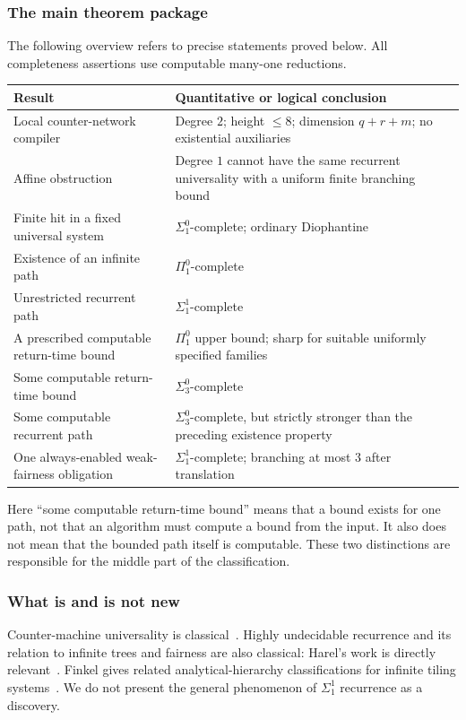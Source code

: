 \documentclass[11pt,letterpaper]{article}
\theoremstyle{definition}
\theoremstyle{remark}
\newcommand{\1}{\mathbf 1}
\begin{document}
\subsubsection{The main theorem package}

The following overview refers to precise statements proved below. All
completeness assertions use computable many-one reductions.

\begin{center}
\small
\begin{tabular}{@{}p{}p{}@{}}
\toprule
Result & Quantitative or logical conclusion\\
\midrule
Local counter-network compiler & Degree $2$; height $\leq8$; dimension
$q+r+m$; no existential auxiliaries\\
Affine obstruction & Degree $1$ cannot have the same recurrent universality
with a uniform finite branching bound\\
Finite hit in a fixed universal system & $\Sigma^0_1$-complete; ordinary
Diophantine\\
Existence of an infinite path & $\Pi^0_1$-complete\\
Unrestricted recurrent path & $\Sigma^1_1$-complete\\
A prescribed computable return-time bound & $\Pi^0_1$ upper bound; sharp
for suitable uniformly specified families\\
Some computable return-time bound & $\Sigma^0_3$-complete\\
Some computable recurrent path & $\Sigma^0_3$-complete, but strictly stronger
than the preceding existence property\\
One always-enabled weak-fairness obligation & $\Sigma^1_1$-complete;
branching at most $3$ after translation\\
\bottomrule
\end{tabular}
\end{center}

Here ``some computable return-time bound'' means that a bound exists for one
path, not that an algorithm must compute a bound from the input. It also does
not mean that the bounded path itself is computable. These two distinctions
are responsible for the middle part of the classification.

\subsubsection{What is and is not new}

Counter-machine universality is classical~\cite{shepherdson-sturgis}.
Highly undecidable recurrence and its relation to infinite trees and fairness
are also classical: Harel's work is directly relevant~\cite{harel1985,harel1986}.
Finkel gives related analytical-hierarchy classifications for infinite tiling
systems~\cite{finkel2008}. We do not present the general phenomenon of
$\Sigma^1_1$ recurrence as a discovery.
\end{document}
